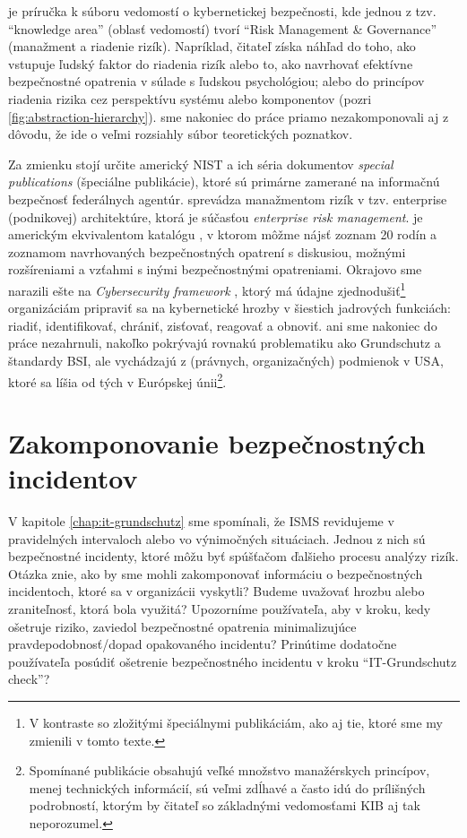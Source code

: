 \cite{CyBOK} je príručka k súboru vedomostí o kybernetickej bezpečnosti, kde jednou z tzv. \enquote{knowledge area} (oblasť
vedomostí) tvorí \enquote{Risk Management \& Governance} (manažment a riadenie rizík). Napríklad, čitateľ získa náhľad do toho, ako vstupuje ľudský faktor
do riadenia rizík alebo to, ako navrhovať efektívne bezpečnostné opatrenia v súlade s ľudskou psychológiou; alebo do princípov riadenia rizika cez perspektívu
systému alebo komponentov (pozri \ref{fig:abstraction-hierarchy}). \cite{CyBOK} sme nakoniec do práce priamo nezakomponovali aj z dôvodu, že ide o
veľmi rozsiahly súbor teoretických poznatkov. 



Za zmienku stojí určite americký NIST a ich séria dokumentov \emph{special publications} (špeciálne publikácie), ktoré sú primárne zamerané na informačnú bezpečnosť
federálnych agentúr. \cite{NIST-800/39} sprevádza manažmentom rizík v tzv. enterprise (podnikovej) architektúre, ktorá je súčasťou \emph{enterprise risk management}.
\cite{NIST-800/53} je americkým ekvivalentom katalógu \cite{GSK}, v ktorom môžme nájsť zoznam 20 rodín a zoznamom navrhovaných bezpečnostných opatrení s diskusiou,
možnými rozšíreniami a vzťahmi s inými bezpečnostnými opatreniami. Okrajovo sme narazili ešte na \emph{Cybersecurity framework} \cite{CSF}, ktorý má údajne
zjednodušiť\footnote{V kontraste so zložitými špeciálnymi publikáciám, ako aj tie, ktoré sme my zmienili v tomto texte.} organizáciám pripraviť sa na kybernetické
hrozby v šiestich jadrových funkciách: riadiť, identifikovať, chrániť, zisťovať, reagovať a obnoviť. \cite{NIST-800/39} ani \cite{NIST-800/53} sme nakoniec do práce
nezahrnuli, nakoľko pokrývajú rovnakú problematiku ako Grundschutz a štandardy BSI, ale vychádzajú z (právnych, organizačných) podmienok v USA, ktoré sa líšia od tých
v Európskej únii\footnote{Spomínané publikácie obsahujú veľké množstvo manažérskych princípov, menej technických informácií, sú veľmi zdĺhavé a často idú do prílišných
podrobností, ktorým by čitateľ so základnými vedomosťami KIB aj tak neporozumel.}.

\section{Zakomponovanie bezpečnostných incidentov}

V kapitole \ref{chap:it-grundschutz} sme spomínali, že ISMS revidujeme v pravidelných intervaloch alebo vo výnimočných situáciach. Jednou z nich sú bezpečnostné
incidenty, ktoré môžu byť spúšťačom ďalšieho procesu analýzy rizík. Otázka znie, ako by sme mohli zakomponovať informáciu o bezpečnostných incidentoch, ktoré
sa v organizácii vyskytli? Budeme uvažovať hrozbu alebo zraniteľnosť, ktorá bola využitá? Upozorníme používateľa, aby v kroku, kedy ošetruje riziko, zaviedol
bezpečnostné opatrenia minimalizujúce pravdepodobnosť/dopad opakovaného incidentu? Prinútime dodatočne používateľa posúdiť ošetrenie bezpečnostného incidentu v
kroku \enquote{IT-Grundschutz check}?

